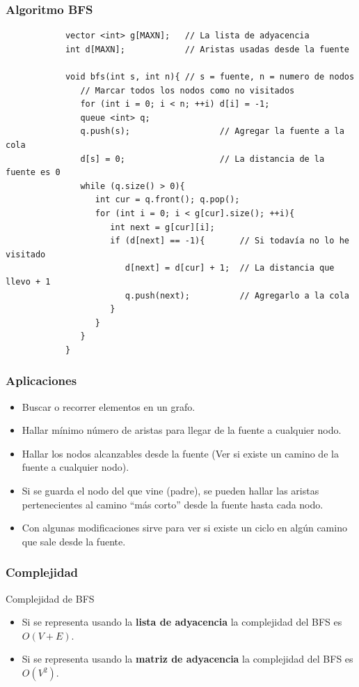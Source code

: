 \documentclass{beamer}
\begin{document}
	\begin{frame}[fragile]
		\frametitle{Algoritmo BFS}
		\begin{lstlisting}
			vector <int> g[MAXN];   // La lista de adyacencia
			int d[MAXN];            // Aristas usadas desde la fuente

			void bfs(int s, int n){ // s = fuente, n = numero de nodos
			   // Marcar todos los nodos como no visitados
			   for (int i = 0; i < n; ++i) d[i] = -1;
			   queue <int> q;                
			   q.push(s);                  // Agregar la fuente a la cola
			   d[s] = 0;                   // La distancia de la fuente es 0
			   while (q.size() > 0){
			      int cur = q.front(); q.pop();
			      for (int i = 0; i < g[cur].size(); ++i){
			         int next = g[cur][i];
			         if (d[next] == -1){       // Si todavía no lo he visitado
			            d[next] = d[cur] + 1;  // La distancia que llevo + 1
			            q.push(next);          // Agregarlo a la cola
			         }
			      }
			   }
			}
		\end{lstlisting}
	\end{frame}
	
	\begin{frame}
		\frametitle{Aplicaciones}
		\begin{itemize}
			\item Buscar o recorrer elementos en un grafo.
			\item Hallar mínimo número de aristas para llegar de la fuente a cualquier nodo.
			\item Hallar los nodos alcanzables desde la fuente (Ver si existe un camino de la fuente a cualquier nodo).
			\item Si se guarda el nodo del que vine (padre), se pueden hallar las aristas pertenecientes al camino ``más corto'' desde la fuente hasta cada nodo.
			\item Con algunas modificaciones sirve para ver si existe un ciclo en algún camino que sale desde la fuente.
		\end{itemize}
	\end{frame}
	
	\begin{frame}
		\frametitle{Complejidad}
		\begin{block}{Complejidad de BFS}
			\begin{itemize}
				\item Si se representa usando la \textbf{lista de adyacencia} la complejidad del BFS es $O(V+E)$.
				\item Si se representa usando la \textbf{matriz de adyacencia} la complejidad del BFS es $O(V^2)$.
			\end{itemize}
		\end{block}
	\end{frame}
	
\end{document}
